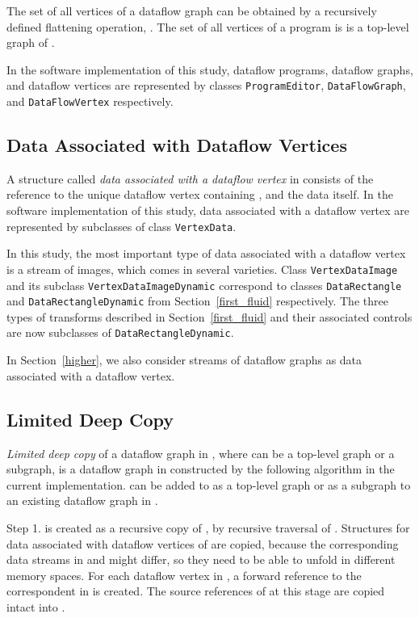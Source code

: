 \documentclass{llncs}
\begin{document}
The set of all vertices of a dataflow graph can be obtained by a recursively defined flattening operation,
. The set of all vertices of a program is  is a top-level graph of .

In the software implementation of this study, dataflow programs, dataflow graphs, and dataflow vertices are represented by
classes {\tt ProgramEditor}, {\tt DataFlowGraph}, and {\tt DataFlowVertex} respectively.

\subsection{Data Associated with Dataflow Vertices}

A structure  called {\em data associated with a dataflow vertex} in  consists of the reference to the unique dataflow vertex  containing ,
and the data itself. In the software implementation of this study, data associated with a dataflow vertex are represented by subclasses of class {\tt VertexData}.

In this study, the most important type of data associated with a dataflow vertex is a stream of images, which comes in several varieties. Class {\tt VertexDataImage}
and its subclass {\tt VertexDataImageDynamic} correspond to classes {\tt  DataRectangle} and {\tt  DataRectangleDynamic} from Section~\ref{first_fluid} respectively.
The three types of transforms described in Section~\ref{first_fluid} and their associated controls are now subclasses of {\tt  DataRectangleDynamic}.

In Section~\ref{higher}, we also consider streams of dataflow graphs as data associated with a dataflow vertex.

\subsection{Limited Deep Copy}\label{limited_deep_copy}

{\em Limited deep copy} of a dataflow graph  in , where  can be a top-level graph or a subgraph, is a dataflow graph  in  constructed 
by the following algorithm in the current implementation.  can be added to  as a top-level graph or as a subgraph to an existing dataflow graph in .

Step 1.  is created as a recursive copy of , by recursive traversal of . Structures for data associated with dataflow vertices of  are copied, because
the corresponding data streams in  and  might differ, so they need to be able to unfold in different memory spaces.
For each dataflow vertex  in , a forward reference to the correspondent  in  is created.
The source references of  at this stage are copied intact into . 
\end{document}
